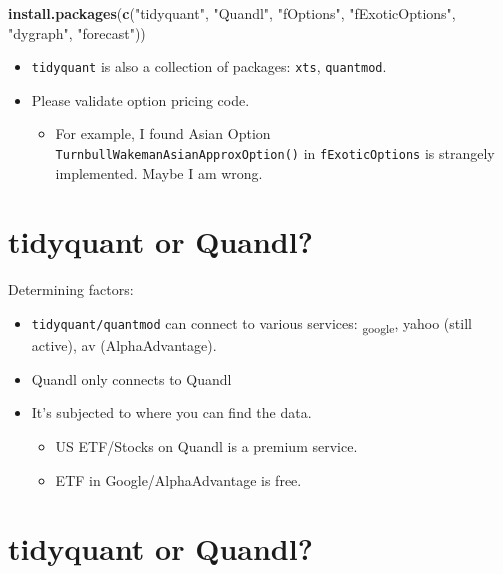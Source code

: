 \documentclass[]{article}
\newenvironment{Shaded}{\begin{snugshade}}{\end{snugshade}}
\newcommand{\KeywordTok}[1]{\textcolor[rgb]{0.13,0.29,0.53}{\textbf{#1}}}
\newcommand{\NormalTok}[1]{#1}
\newcommand{\StringTok}[1]{\textcolor[rgb]{0.31,0.60,0.02}{#1}}
\providecommand{\tightlist}{%
  \setlength{\itemsep}{0pt}\setlength{\parskip}{0pt}}
\begin{document}
\begin{Shaded}
\begin{Highlighting}[]
\KeywordTok{install.packages}\NormalTok{(}\KeywordTok{c}\NormalTok{(}\StringTok{"tidyquant"}\NormalTok{, }\StringTok{"Quandl"}\NormalTok{, }\StringTok{"fOptions"}\NormalTok{, }\StringTok{"fExoticOptions"}\NormalTok{, }\StringTok{"dygraph"}\NormalTok{, }\StringTok{"forecast"}\NormalTok{))}
\end{Highlighting}
\end{Shaded}

\begin{itemize}
\item
  \texttt{tidyquant} is also a collection of packages: \texttt{xts},
  \texttt{quantmod}.
\item
  Please validate option pricing code.

  \begin{itemize}
  \tightlist
  \item
    For example, I found Asian Option
    \texttt{TurnbullWakemanAsianApproxOption()} in
    \texttt{fExoticOptions} is strangely implemented. Maybe I am wrong.
  \end{itemize}
\end{itemize}

\hypertarget{tidyquant-or-quandl}{%
\section{tidyquant or Quandl?}\label{tidyquant-or-quandl}}

Determining factors:

\begin{itemize}
\tightlist
\item
  \texttt{tidyquant/quantmod} can connect to various services:
  \textsubscript{google}, yahoo (still active), av (AlphaAdvantage).
\item
  Quandl only connects to Quandl
\item
  It's subjected to where you can find the data.

  \begin{itemize}
  \tightlist
  \item
    US ETF/Stocks on Quandl is a premium service.
  \item
    ETF in Google/AlphaAdvantage is free.
  \end{itemize}
\end{itemize}

\hypertarget{tidyquant-or-quandl-1}{%
\section{tidyquant or Quandl?}\label{tidyquant-or-quandl-1}}
\end{document}
